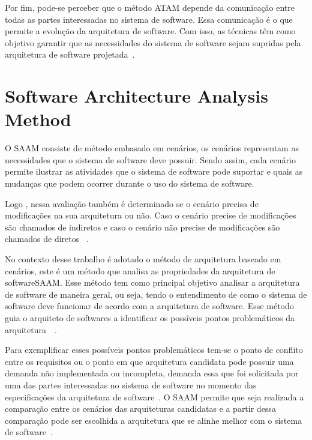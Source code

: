 Por fim, pode-se perceber que o método \acrfull{ATAM} depende da comunicação entre todas as partes interessadas no sistema de software. Essa comunicação é o que permite a evolução da arquitetura de software. Com isso, as técnicas têm como objetivo garantir que as necessidades do sistema de software sejam supridas pela arquitetura de software projetada~\cite{ATAM}.

\section{Software Architecture Analysis Method}

O \acrfull{SAAM} consiste de método embasado em cenários, os cenários representam as necessidades que o sistema de software deve possuir. Sendo assim, cada cenário permite ilustrar as atividades que o sistema de software pode suportar e quais as mudanças que podem ocorrer durante o uso do sistema de software. 

Logo , nessa avaliação também é determinado se o cenário precisa de modificações na sua arquitetura ou não. Caso o cenário precise de modificações são chamados de indiretos e caso o cenário não precise de modificações são chamados de diretos ~\cite{survey_methods}.

No contexto desse trabalho é adotado o método de arquitetura baseado em cenários, este é um método que analisa as propriedades da arquitetura de software\acrfull{SAAM}.
Esse método tem como principal objetivo analisar a arquitetura de software de maneira geral, ou seja, tendo o entendimento de como o sistema de software deve funcionar de acordo com a arquitetura de software. Esse método guia o arquiteto de softwares a identificar os possíveis pontos problemáticos da arquitetura~\cite{survey_methods}~\cite{scenario_methods}.

Para exemplificar esses possíveis pontos problemáticos tem-se o ponto de conflito entre os requisitos ou o ponto em que  arquitetura candidata pode possuir uma demanda não implementada ou incompleta, demanda essa que foi solicitada por uma das partes interessadas no sistema de software no momento das especificações da arquitetura de software~\cite{survey_methods}.
O \acrfull{SAAM} permite que seja realizada a comparação entre os cenários das arquiteturas candidatas e a partir dessa comparação pode ser escolhida a arquitetura que se alinhe melhor com o sistema de software~\cite{survey_methods}.

%


